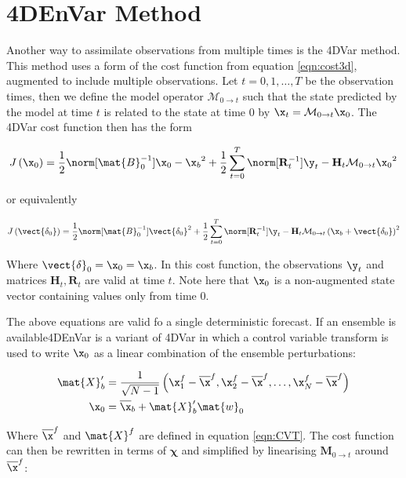 
\chapter{4DEnVar Method} %

Another way to assimilate observations from multiple times is the 4DVar method. This method uses a form of the cost function from equation \ref{eqn:cost3d}, augmented to include multiple observations. Let $t = 0,1,\dots,T$ be the observation times, then we define the model operator  $\mathcal{M}_{0 \rightarrow t}$ such that the state predicted by the model at time $t$ is related to the state at time 0 by $\x_t = \mathcal{M}_{0 \rightarrow t}\x_0$. The 4DVar cost function then has the form

\begin{equation}
J\left(\x_0\right) = \frac 1 2 \norm[\mat{B}_0^{-1}]{\x_0 - \x_b}^2 + \frac 1 2 \sum_{t=0}^T \norm[\mathbf{R}_t^{-1}]{\y_t - \mathbf{H}_t\mathcal{M}_{0 \rightarrow t}\x_0}^2
\label{eqn:cost4d}
\end{equation}

or equivalently

\begin{equation}
J\left(\vect{\delta_0}\right) = \frac 1 2 \norm[\mat{B}_0^{-1}]{\vect{\delta_0}}^2 + \frac 1 2 \sum_{t=0}^T \norm[\mathbf{R}_t^{-1}]{\y_t - \mathbf{H}_t\mathcal{M}_{0 \rightarrow t}\left( \x_b + \vect{\delta_0} \right)}^2
\label{eqn:cost4d}
\end{equation}

Where $\vect{\delta}_0 = \x_0 = \x_b$. In this cost function, the observations $\y_t$ and matrices $\mathbf{H}_t,\mathbf{R}_t$ are valid at time $t$. Note here that $\x_0$ is a non-augmented state vector containing values only from time 0.

The above equations are valid fo a single deterministic forecast. If an ensemble is available4DEnVar is a variant of 4DVar in which a control variable transform is used to write $\x_0$ as a linear combination of the ensemble perturbations:

\begin{align*}
\mat{X}'_b &= \frac{1}{\sqrt{N- 1}} \left( \x^f_1 - \overline{\x}^f, \x^f_2 - \overline{\x}^f, \dots, \x^f_N - \overline{\x}^f \right) \\
\x_0 &= \overline{\x}_b + \mat{X}'_b \mat{w}_0
\end{align*}

Where $\overline{\x}^f$ and $\mat{X}^f$ are defined in equation \ref{eqn:CVT}. The cost function can then be rewritten in terms of $\mathbf{\chi}$ and simplified by linearising $\mathbf{M}_{0 \rightarrow t}$ around $\overline{\x}^f$:

